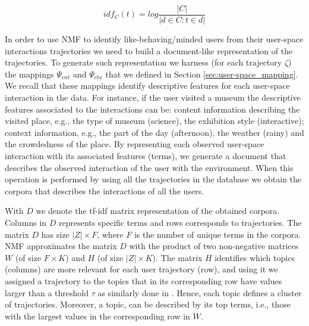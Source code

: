 $$idf_C(t)=log \frac{|C|}{|d\in C: t\in d|}$$ 


In order to use NMF to identify like-behaving/minded users from their user-space interactions trajectories we need to build a document-like representation of the trajectories. To generate such representation we harness (for each trajectory $\zeta$) the mappings $\Psi_{cnt}$ and $\Psi_{ctx}$ that we defined in Section \ref{sec:user-space_mapping}. We recall that these mappings identify descriptive features for each user-space interaction in the data. For instance, if the user visited a museum the descriptive features associated to the interactions can be: content information describing the visited place, e.g., the type of museum (science), the exhibition style (interactive); context information, e.g., the part of the day (afternoon), the weather (rainy) and the crowdedness of the place.
By representing each observed user-space interaction with its associated features (terms), we generate a document that describes the observed interaction of the user with the environment. When this operation is performed by using all the trajectories in the database we obtain the corpora that describes the interactions of all the users. 

With $D$ we denote the tf-idf matrix representation of the obtained corpora.
Columns in $D$ represents specific terms and rows corresponds to trajectories. 
The matrix $D$ has size $|Z| \times F$, where $F$ is the number of unique terms in the corpora. NMF approximates the matrix $D$ with the product of two non-negative matrices $W$ (of size $F \times K$) and $H$  (of size $|Z| \times K$). The matrix $H$ identifies which topics (columns) are more relevant for each user trajectory (row), and using it we assigned a trajectory to the topics that in its corresponding row have values larger than a threshold $\tau$ as similarly done in \cite{nmf:multilabelannotation:2017}. Hence, each topic defines a cluster of trajectories.
Moreover, a topic, can be described by its top terms, i.e., those with the largest values in the corresponding row in $W$.

